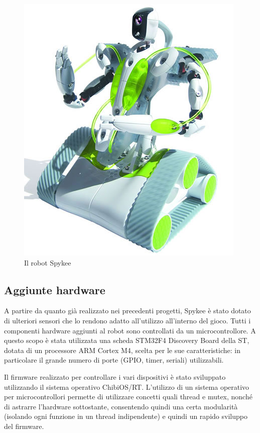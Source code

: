 \begin{figure}[h]
\centering
\includegraphics[scale=0.4]{images/spykee}
\caption{Il robot Spykee}
\end{figure}

\subsection*{Aggiunte hardware}
A partire da quanto già realizzato nei precedenti progetti, Spykee è stato dotato di ulteriori sensori che lo rendono adatto all'utilizzo all'interno del gioco. Tutti i componenti hardware aggiunti al robot sono controllati da un microcontrollore. A questo scopo è stata utilizzata una scheda STM32F4 Discovery Board della ST, dotata di un processore ARM Cortex M4, scelta per le sue caratteristiche: in particolare il grande numero di porte (GPIO, timer, seriali) utilizzabili.

Il firmware realizzato per controllare i vari dispositivi è stato sviluppato utilizzando il sistema operativo ChibiOS/RT\cite{chibios}. L'utilizzo di un sistema operativo per microcontrollori permette di utilizzare concetti quali thread e mutex, nonché di astrarre l'hardware sottostante, consentendo quindi una certa modularità (isolando ogni funzione in un thread indipendente) e quindi un rapido sviluppo del firmware.

